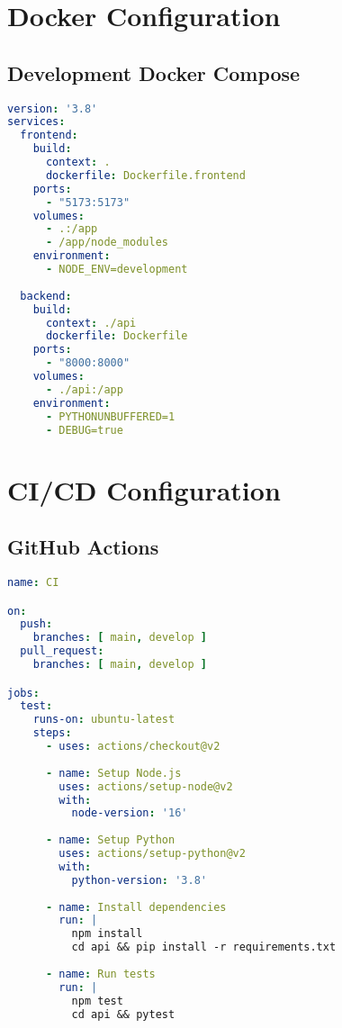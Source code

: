 \section{Docker Configuration}
\subsection{Development Docker Compose}
\begin{tcolorbox}[title=docker-compose.yml]
\begin{lstlisting}[language=yaml]
version: '3.8'
services:
  frontend:
    build:
      context: .
      dockerfile: Dockerfile.frontend
    ports:
      - "5173:5173"
    volumes:
      - .:/app
      - /app/node_modules
    environment:
      - NODE_ENV=development
      
  backend:
    build:
      context: ./api
      dockerfile: Dockerfile
    ports:
      - "8000:8000"
    volumes:
      - ./api:/app
    environment:
      - PYTHONUNBUFFERED=1
      - DEBUG=true
\end{lstlisting}
\end{tcolorbox}

\section{CI/CD Configuration}
\subsection{GitHub Actions}
\begin{tcolorbox}[title=.github/workflows/ci.yml]
\begin{lstlisting}[language=yaml]
name: CI

on:
  push:
    branches: [ main, develop ]
  pull_request:
    branches: [ main, develop ]

jobs:
  test:
    runs-on: ubuntu-latest
    steps:
      - uses: actions/checkout@v2
      
      - name: Setup Node.js
        uses: actions/setup-node@v2
        with:
          node-version: '16'
          
      - name: Setup Python
        uses: actions/setup-python@v2
        with:
          python-version: '3.8'
          
      - name: Install dependencies
        run: |
          npm install
          cd api && pip install -r requirements.txt
          
      - name: Run tests
        run: |
          npm test
          cd api && pytest
\end{lstlisting}
\end{tcolorbox}
